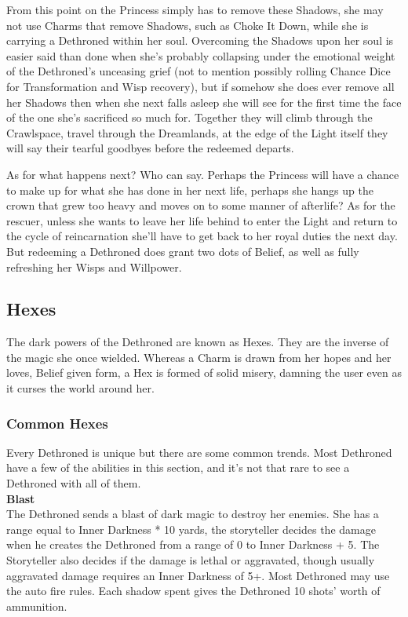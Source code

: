 From this point on the Princess simply has to remove these Shadows, she may not use Charms that remove Shadows, such as Choke It Down, while she is carrying a Dethroned within her soul. Overcoming the Shadows upon her soul is easier said than done when she's probably collapsing under the emotional weight of the Dethroned's unceasing grief (not to mention possibly rolling Chance Dice for Transformation and Wisp recovery), but if somehow she does ever remove all her Shadows then when she next falls asleep she will see for the first time the face of the one she's sacrificed so much for. Together they will climb through the Crawlspace, travel through the Dreamlands, at the edge of the Light itself they will say their tearful goodbyes before the redeemed departs. 

As for what happens next? Who can say. Perhaps the Princess will have a chance to make up for what she has done in her next life, perhaps she hangs up the crown that grew too heavy and moves on to some manner of afterlife? As for the rescuer, unless she wants to leave her life behind to enter the Light and return to the cycle of reincarnation she'll have to get back to her royal duties the next day. But redeeming a Dethroned does grant two dots of Belief, as well as fully refreshing her Wisps and Willpower. 

\subsection*{Hexes}
The dark powers of the Dethroned are known as Hexes. They are the inverse of the magic she once wielded. Whereas a Charm is drawn from her hopes and her loves, Belief given form, a Hex is formed of solid misery, damning the user even as it curses the world around her. 

\subsubsection*{Common Hexes}
Every Dethroned is unique but there are some common trends. Most Dethroned have a few of the abilities in this section, and it's not that rare to see a Dethroned with all of them.\\

\noindent \textbf{Blast}\\

\noindent The Dethroned sends a blast of dark magic to destroy her enemies. She has a range equal to Inner Darkness * 10 yards, the storyteller decides the damage when he creates the Dethroned from a range of 0 to Inner Darkness + 5. The Storyteller also decides if the damage is lethal or aggravated, though usually aggravated damage requires an Inner Darkness of 5+. Most Dethroned may use the auto fire rules. Each shadow spent gives the Dethroned 10 shots' worth of ammunition. \\

